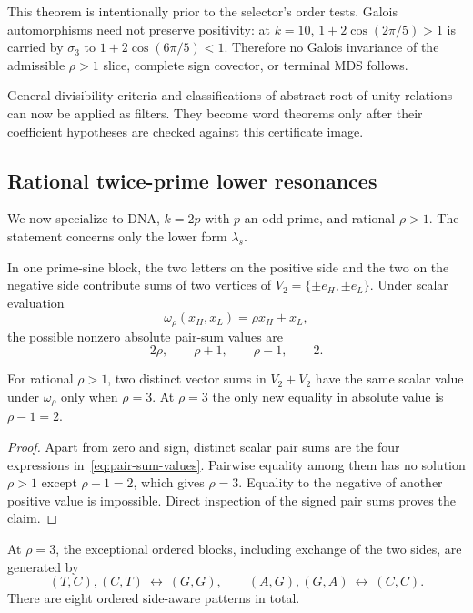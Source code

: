 This theorem is intentionally prior to the selector's order tests.  Galois
automorphisms need not preserve positivity: at $k=10$,
$1+2\cos(2\pi/5)>1$ is carried by $\sigma_3$ to
$1+2\cos(6\pi/5)<1$.  Therefore no Galois invariance of the admissible
$\rho>1$ slice, complete sign covector, or terminal MDS follows.

General divisibility criteria and classifications of abstract root-of-unity
relations~\cite{Mann1965,ConwayJones1976,LamLeung2000,KoleyArikatla2019,DeCarliLaporta2026}
can now be applied as filters.  They become word theorems only after their
coefficient hypotheses are checked against this certificate image.

\subsection{Rational twice-prime lower resonances}
\label{sec:rational-classification}

We now specialize to DNA, $k=2p$ with $p$ an odd prime, and rational
$\rho>1$.  The statement concerns only the lower form $\lambda_s$.

In one prime-sine block, the two letters on the positive side and the two on
the negative side contribute sums of two vertices of
$V_2=\{\pm e_H,\pm e_L\}$.  Under scalar evaluation
\[
  \omega_\rho(x_H,x_L)=\rho x_H+x_L,
\]
the possible nonzero absolute pair-sum values are
\begin{equation}
  2\rho,\qquad \rho+1,\qquad \rho-1,\qquad 2.                            \label{eq:pair-sum-values}
\end{equation}

\begin{lemma}
\label{lem:rho-three}
For rational $\rho>1$, two distinct vector sums in $V_2+V_2$ have the same
scalar value under $\omega_\rho$ only when $\rho=3$.  At $\rho=3$ the only
new equality in absolute value is $\rho-1=2$.
\end{lemma}

\begin{proof}
Apart from zero and sign, distinct scalar pair sums are the four expressions
in~\eqref{eq:pair-sum-values}.  Pairwise equality among them has no solution
$\rho>1$ except $\rho-1=2$, which gives $\rho=3$.  Equality to the negative
of another positive value is impossible.  Direct inspection of the signed
pair sums proves the claim.
\end{proof}

At $\rho=3$, the exceptional ordered blocks, including exchange of the two
sides, are generated by
\begin{equation}
  (T,C),(C,T)\ \longleftrightarrow\ (G,G),
  \qquad
  (A,G),(G,A)\ \longleftrightarrow\ (C,C).                               \label{eq:exceptional-blocks}
\end{equation}
There are eight ordered side-aware patterns in total.

